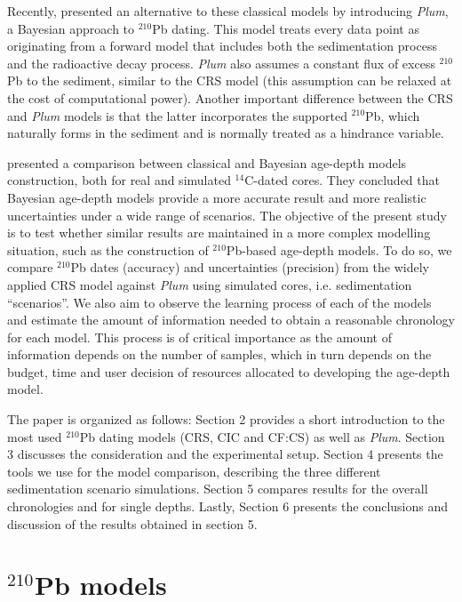 \documentclass [10pt] {article}
\begin{document}
	Recently, \citet{Aquino2018} presented an alternative to these classical models by introducing \textit{Plum}, a Bayesian approach to $^{210}$Pb dating.
This model treats every data point as originating from a forward model that includes both the sedimentation process and the radioactive decay process.
\textit{Plum} also assumes a constant flux of excess $^{210}$Pb to the sediment, similar to the CRS model (this assumption can be relaxed at the cost of computational power).
Another important difference between the CRS and \textit{Plum} models is that the latter incorporates the supported $^{210}$Pb, which naturally forms in the sediment and is normally treated as a hindrance variable.

	\citet{Blaauw2018} presented a comparison between classical and Bayesian age-depth models construction, both for real and simulated $^{14}$C-dated cores.
They concluded that Bayesian age-depth models provide a more accurate result and more realistic uncertainties under a wide range of scenarios.  
The objective of the present study is to test whether similar results are maintained in a more complex modelling situation, such as the construction of $^{210}$Pb-based age-depth models.
To do so, we compare $^{210}$Pb dates (accuracy) and uncertainties (precision) from the widely applied CRS model against \textit{Plum} using simulated cores, i.e. sedimentation ``scenarios''.
We also aim to observe the learning process of each of the models and estimate the amount of information needed to obtain a reasonable chronology for each model.
This process is of critical importance as the amount of information depends on the number of samples, which in turn depends on the budget, time and user decision of resources allocated to developing the age-depth model. 


	The paper is organized as follows: 
Section 2 provides a short introduction to the most used $^{210}$Pb dating models (CRS, CIC and CF:CS) as well as \textit{Plum}.
Section 3 discusses the consideration and the experimental setup.
Section 4 presents the tools we use for the model comparison, describing the three different sedimentation scenario simulations.
Section 5 compares results for the overall chronologies and for single depths.
Lastly, Section 6 presents the conclusions and discussion of the results obtained in section 5. 

\section{$^{210}$Pb models}
\end{document}
